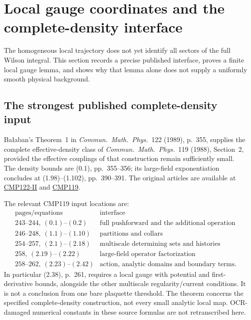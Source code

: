\section{Local gauge coordinates and the complete-density interface}
\label{fmg-section}

The homogeneous local trajectory does not yet identify all sectors
of the full Wilson integral. This section records a precise published
interface, proves a finite local gauge lemma, and shows why that
lemma alone does not supply a uniformly smooth physical background.

\subsection{The strongest published complete-density input}
\label{fmg-source}

Ba{\l}aban's Theorem~1 in \emph{Commun.\ Math.\ Phys.}\ 122
(1989), p.~355, supplies the complete effective-density class of
\emph{Commun.\ Math.\ Phys.}\ 119 (1988), Section~2, provided the
effective couplings of that construction remain sufficiently small.
The density bounds are (0.1), pp.~355--356; its large-field
exponentiation concludes at (1.98)--(1.102), pp.~390--391.
The original articles are available at
\href{https://scispace.com/pdf/large-field-renormalization-ii-localization-exponentiation-h8b7ih93xo.pdf}
{CMP122-II} and
\href{https://scispace.com/pdf/convergent-renormalization-expansions-for-lattice-gauge-29jyexd38e.pdf}
{CMP119}.

The relevant CMP119 input locations are:
\[
\begin{array}{c|l}
\text{pages/equations}&\text{interface}\\ \hline
243\text{--}244,\ (0.1)\text{--}(0.2)&
       \text{full pushforward and the additional operation}\\
246\text{--}248,\ (1.1)\text{--}(1.10)&
       \text{partitions and collars}\\
254\text{--}257,\ (2.1)\text{--}(2.18)&
       \text{multiscale determining sets and histories}\\
258,\ (2.19)\text{--}(2.22)&
       \text{large-field operator factorization}\\
258\text{--}262,\ (2.23)\text{--}(2.42)&
       \text{action, analytic domains and boundary terms}.
\end{array}
\]
In particular (2.38), p.~261, requires a local gauge with potential
and first-derivative bounds, alongside the other multiscale
regularity/current conditions. It is not a conclusion from one
bare plaquette threshold. The theorem concerns the specified
complete-density construction, not every small analytic local map.
OCR-damaged numerical constants in these source formulas are not
retranscribed here.

